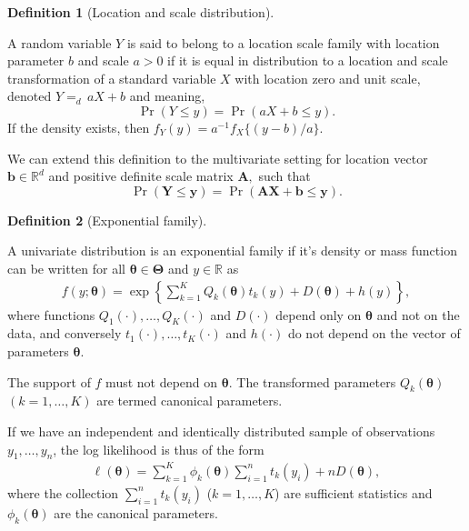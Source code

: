 \documentclass[
  11pt,
  letterpaper,
]{scrbook}
\theoremstyle{definition}
\theoremstyle{definition}
\theoremstyle{definition}
\newtheorem{definition}{Definition}[chapter]
\theoremstyle{plain}
\theoremstyle{plain}
\theoremstyle{plain}
\theoremstyle{remark}
\begin{document}
\begin{definition}[Location and scale
distribution]\protect\hypertarget{def-location-scale}{}\label{def-location-scale}

A random variable \(Y\) is said to belong to a location scale family
with location parameter \(b\) and scale \(a>0\) if it is equal in
distribution to a location and scale transformation of a standard
variable \(X\) with location zero and unit scale, denoted
\(Y {=}_d\, aX + b\) and meaning,
\[\Pr(Y \leq y) = \Pr(aX + b \leq y).\] If the density exists, then
\(f_Y(y) = a^{-1}f_X\{(y-b)/a\}.\)

We can extend this definition to the multivariate setting for location
vector \(\boldsymbol{b} \in \mathbb{R}^d\) and positive definite scale
matrix \(\mathbf{A},\) such that
\[\Pr(\boldsymbol{Y} \leq \boldsymbol{y}) = \Pr(\mathbf{A}\boldsymbol{X} + \boldsymbol{b} \leq \boldsymbol{y}).\]

\end{definition}

\begin{definition}[Exponential
family]\protect\hypertarget{def-exponential-family}{}\label{def-exponential-family}

A univariate distribution is an exponential family if it's density or
mass function can be written for all
\(\boldsymbol{\theta} \in \boldsymbol{\Theta}\) and \(y \in \mathbb{R}\)
as \begin{align*}
f(y; \boldsymbol{\theta}) = \exp\left\{ \sum_{k=1}^K Q_k(\boldsymbol{\theta}) t_k(y) + D(\boldsymbol{\theta}) + h(y)\right\}, 
\end{align*} where functions \(Q_1(\cdot), \ldots, Q_K(\cdot)\) and
\(D(\cdot)\) depend only on \(\boldsymbol{\theta}\) and not on the data,
and conversely \(t_1(\cdot), \ldots, t_K(\cdot)\) and \(h(\cdot)\) do
not depend on the vector of parameters \(\boldsymbol{\theta}.\)

The support of \(f\) must not depend on \(\boldsymbol{\theta}.\) The
transformed parameters \(Q_k(\boldsymbol{\theta})\) \((k=1, \ldots, K)\)
are termed canonical parameters.

\end{definition}

If we have an independent and identically distributed sample of
observations \(y_1, \ldots, y_n\), the log likelihood is thus of the
form \begin{align*}
\ell(\boldsymbol{\theta}) = \sum_{k=1}^K \phi_k(\boldsymbol{\theta}) \sum_{i=1}^n t_k(y_i) + n D(\boldsymbol{\theta}),
\end{align*} where the collection \(\sum_{i=1}^n t_k(y_i)\)
(\(k=1, \ldots, K\)) are sufficient statistics and
\(\phi_k(\boldsymbol{\theta})\) are the canonical parameters.
\end{document}
